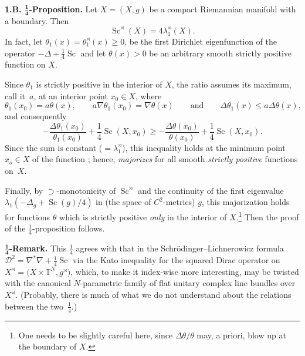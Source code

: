 \documentclass[10pt,a4paper]{amsart}
\numberwithin{equation}{section}
\begin{document}
\textbf{1.B. $\boldsymbol{\frac {1}{4}}$-Proposition.} Let $X=(X,g)$ be a compact Riemannian manifold with a boundary. Then
\[
\operatorname{Sc}^\rtimes (X)= 4\lambda_1^\rtimes(X).
\]
In fact, let $\theta_1(x)=\theta^\rtimes_1(x)\geq 0$, be the first Dirichlet eigenfunction of the operator $-\Delta +\frac {1}{4}\operatorname{Sc}$ and
let $\theta(x)>0$ be an arbitrary smooth strictly positive function on $X$.

Since $\theta_1$ is strictly positive in the interior of $X$,
the ratio  assumes its maximum, call it~$a$, at an interior point $x_0\in X$, where
\[
\theta_1(x_0)=a\theta(x), \qquad a \nabla\theta_1(x_0)= \nabla\theta(x) \qquad \text{and} \qquad \Delta\theta_1(x)\leq a\Delta\theta(x),
\]
and consequently
\[
-\frac{\Delta\theta_1(x_0)} {\theta_1(x_0)}+\frac14 \operatorname{Sc}(X,x_0)\geq -\frac{\Delta\theta(x_0)} {\theta(x_0)}+\frac14 \operatorname{Sc}(X,x_0).
\]
Since the sum  is constant ($=\lambda_1^\rtimes$), this
inequality holds at the minimum point $x_o\in X$ of the function
 ; hence,
 {\it majorizes}  for all smooth {\it strictly positive} functions on~$X$.

Finally, by {\large$\supset$}-monotonicity of $\operatorname{Sc}^\rtimes$ and the continuity of the first eigenvalue $\lambda_1(-\Delta_g + \operatorname{Sc}(g)/4)$ in (the space of $C^2$-metrics) $g$, this majorization holds for functions $\theta$ which is strictly positive {\it only} in the interior of $X$.\footnote {One needs to be slightly careful here, since
$\Delta \theta/\theta$ may, a priori, blow up at the boundary of $X$.} Then
the proof of the $\frac {1}{4}$-proposition follows.

\textbf{$\boldsymbol{\frac{1}{4}}$-Remark.} This $\frac{1}{4}$ agrees with that in the
Schr\"odinger--Lichnerowicz formula $\mathcal D^2=\nabla^\ast\nabla+\frac{1}{4}\operatorname{Sc}$ via the Kato inequality for the squared Dirac operator on $X^\rtimes =\bigl(X\times \mathbb T^N, g^\rtimes\bigr)$, which, to make it index-wise more interesting, may be twisted with the canonical $N$-parametric family of flat unitary complex line bundles over~$X^\rtimes$.
(Probably, there is much of what we do not understand about the relations between the two~$\frac{1}{4}$.)
\end{document}
